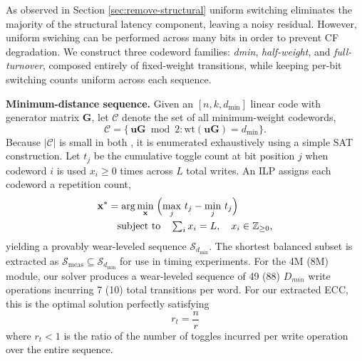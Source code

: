 As observed in Section \ref{sec:remove-structural} uniform switching eliminates the majority of the structural latency component, leaving a noisy residual. However, uniform swiching can be performed across many bits in order to prevent CF degradation.
We construct three codeword families: \emph{dmin}, \emph{half-weight}, and \emph{full-turnover}, composed entirely of fixed-weight transitions, while keeping per-bit switching counts uniform across each sequence. 



\textbf{Minimum-distance sequence.}
Given an $[n,k,d_{\min}]$ linear code with generator matrix $\mathbf{G}$, let $\mathcal{C}$ denote the set of all minimum-weight codewords,
\begin{equation}
    \mathcal{C} = \bigl\{\,\mathbf{u}\mathbf{G} \bmod 2
                  : \mathrm{wt}(\mathbf{u}\mathbf{G}) = d_{\min}\bigr\}.
\end{equation}
Because $|\mathcal{C}|$ is small in both , it is enumerated exhaustively using a simple SAT construction\@. Let $t_j$ be the cumulative toggle count at bit position $j$ when codeword $i$ is used $x_i \geq 0$ times across $L$ total writes. An ILP assigns each codeword a repetition count,
\begin{equation}
\begin{multlined}
    \mathbf{x}^{*} = \arg\min_{\mathbf{x}}\;
                     \Bigl(\max_{j}\,t_j - \min_{j}\,t_j\Bigr)  \\
    \quad \text{subject to} \quad
    \textstyle\sum_{i} x_i = L, \quad x_i \in \mathbb{Z}_{\geq 0},
    \label{eq:ilp}
\end{multlined}
\end{equation}
yielding a provably wear-leveled sequence $\mathcal{S}_{d_{\min}}$. The shortest balanced subset is extracted as $\mathcal{S}_{\mathrm{meas}} \subseteq \mathcal{S}_{d_{\min}}$ for use in timing experiments. For the 4M (8M) module, our solver produces a wear-leveled sequence of 49 (88) $D_{min}$ write operations incurring 7 (10) total transitions per word. For our extracted ECC, this is the optimal solution perfectly satisfying
\begin{equation}
\label{eqn:rt}
    r_t = \frac{n}{r}
\end{equation}
where $r_t < 1$ is the ratio of the number of toggles incurred per write operation over the entire sequence.




